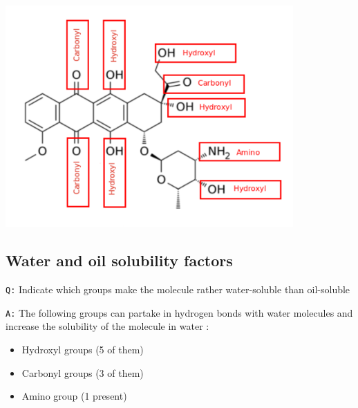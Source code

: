 \documentclass[11pt, a4paper,titlepage]{article}
\begin{document}
\includegraphics[width=11cm]{./Figures/Part3MoleculeFunctionalGroups.pdf}
\subsection{Water and oil solubility factors}
\label{sec-3-2}

\texttt{Q:} Indicate which groups make the molecule rather water-soluble
than oil-soluble

\texttt{A:} The following groups can partake in hydrogen bonds with water
molecules and increase the solubility of the molecule in water :

\begin{itemize}
\item Hydroxyl groups (5 of them)
\item Carbonyl groups (3 of them)
\item Amino group (1 present)
\end{itemize}
\end{document}
